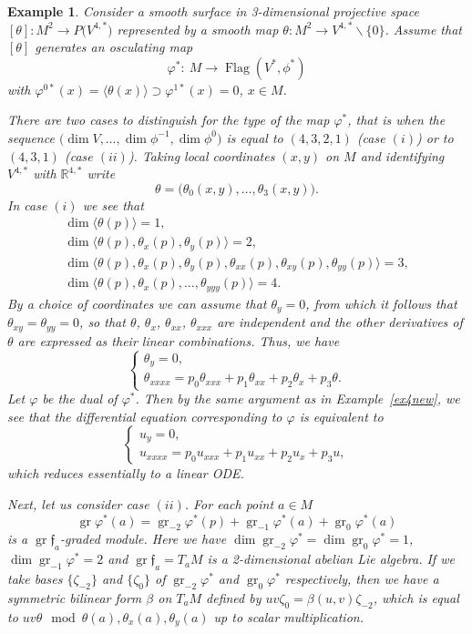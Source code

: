 \documentclass[10pt,a4paper]{amsart}
\newcommand{\R}{\mathbb R}
\newcommand{\cD}{\mathcal D}
\newcommand{\f}{\mathfrak f}
\newcommand{\Flag}{\operatorname{Flag}}
\newcommand{\gr}{\operatorname{gr}}
\newtheorem{ex}[thm]{Example}
\numberwithin{equation}{section}
\begin{document}
\begin{ex}%
Consider a smooth surface in 3-dimensional projective space $[\theta]\colon M^2\to P\big(V^{4,*}\big)$ represented by a smooth map $\theta\colon M^2\to V^{4,*}\backslash \{0\}$. Assume that $[\theta]$ generates an osculating map
\[
\varphi^* \colon\ M\to \Flag(V^*,\phi^*)
\]
with $\varphi^{0*}(x)=\langle \theta(x)\rangle \supset \varphi^{1*}(x)=0$, $x\in M$.

There are two cases to distinguish for the type of the map $\varphi^*$, that is when the sequence $\big(\dim V,\dots,\dim \phi^{-1},\dim \phi^0\big)$ is equal to $(4,3,2,1)$ (case $(i)$) or to $(4,3,1)$ (case $(ii)$). Taking local coordinates $(x,y)$ on $M$ and identifying $V^{4,*}$ with $\R^{4,*}$ write
\[
\theta = \big(\theta_0(x,y),\dots, \theta_3(x,y)\big).
\]
In case $(i)$ we see that
\begin{gather*}
\dim \big\langle \theta(p) \big\rangle = 1,\\[.3ex]
\dim \big\langle \theta(p), \theta_x(p), \theta_y(p) \big\rangle = 2,\\[.3ex]
\dim \big\langle \theta(p), \theta_x(p), \theta_y(p), \theta_{xx}(p), \theta_{xy}(p), \theta_{yy}(p) \big\rangle = 3,\\[.3ex]
\dim \big\langle \theta(p), \theta_x(p), \dots, \theta_{yyy}(p) \big\rangle = 4.
\end{gather*}
By a choice of coordinates we can assume that $\theta_y=0$, from which it follows that $\theta_{xy}=\theta_{yy}=0$, so that $\theta$, $\theta_x$, $\theta_{xx}$, $\theta_{xxx}$ are independent and the other derivatives of $\theta$ are expressed as their linear combinations. Thus, we have
\[
\begin{cases}
\theta_y=0,\\
\theta_{xxxx} = p_0\theta_{xxx}+p_1\theta_{xx}+p_2\theta_{x}+p_3\theta.
\end{cases}
\]
Let $\varphi$ be the dual of $\varphi^*$. Then by the same argument as in Example~\ref{ex4new}, we see that the differential equation corresponding to $\varphi$ is equivalent to
\begin{equation}
\tag{$\cD_i$}
\begin{cases}
u_y=0,\\
u_{xxxx} = p_0u_{xxx}+p_1u_{xx}+p_2u_{x}+p_3u,
\end{cases}
\end{equation}
which reduces essentially to a linear ODE.

Next, let us consider case $(ii)$. For each point $a\in M$
\[
\gr \varphi^*(a) = \gr_{-2}\varphi^*(p)+\gr_{-1}\varphi^*(a)+\gr_0\varphi^*(a)
\]
is a $\gr\f_a$-graded module. Here we have $\dim \gr_{-2}\varphi^*=\dim\gr_{0}\varphi^*=1$, $\dim\gr_{-1}\varphi^*=2$ and $\gr\f_a=T_aM$ is a 2-dimensional abelian Lie algebra. If we take bases $\{\zeta_{-2}\}$ and $\{\zeta_{0}\}$ of $\gr_{-2}\varphi^*$ and $\gr_0\varphi^*$ respectively, then we have a symmetric bilinear form $\beta$ on $T_aM$ defined by $uv\zeta_0 = \beta(u,v)\zeta_{-2}$, which is equal to $uv\theta \mod \theta(a),\theta_x(a),\theta_y(a)$ up to scalar multiplication.


\end{ex}
\end{document}
